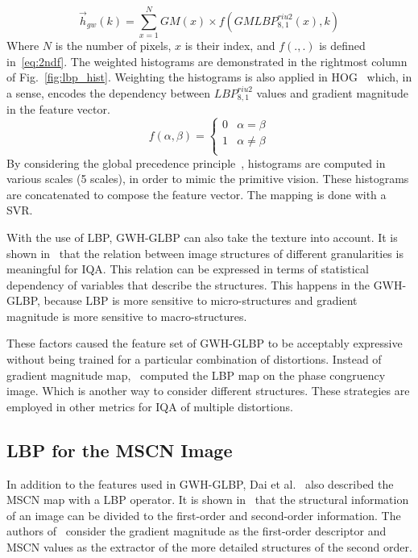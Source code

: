 \begin{equation}
    \Vec{h}_{gw}(k) = \sum_{x = 1}^NGM(x)\times f\left(GMLBP_{8, 1}^{riu2}(x), k\right)
    \label{eq:wh}
\end{equation}
Where $N$ is the number of pixels, $x$ is their index, and $f(., .)$ is defined in~\ref{eq:2ndf}. The weighted histograms are demonstrated in the rightmost column of Fig.~\ref{fig:lbp_hist}. Weighting the histograms is also applied in HOG~\cite{Dalal2005} which, in a sense, encodes the dependency between $LBP_{8, 1}^{riu2}$ values and gradient magnitude in the feature vector.
\begin{equation}
    f(\alpha, \beta) = 
    \begin{cases}
        0 & \alpha = \beta\\
        1 & \alpha \ne \beta\\
    \end{cases}
\label{eq:2ndf}
\end{equation}
By considering the global precedence principle~\cite{Hughes1996}, histograms are computed in various scales (5 scales), in order to mimic the primitive vision. These histograms are concatenated to compose the feature vector. The mapping is done with a SVR.

With the use of LBP, GWH-GLBP can also take the texture into account. It is shown in~\cite{Heydari2019, xue2014blind, Gu2017micromacro} that the relation between image structures of different granularities is meaningful for IQA. This relation can be expressed in terms of statistical dependency of variables that describe the structures. This happens in the GWH-GLBP, because LBP is more sensitive to micro-structures and gradient magnitude is more sensitive to macro-structures.

These factors caused the feature set of GWH-GLBP to be acceptably expressive without being trained for a particular combination of distortions. Instead of gradient magnitude map,~\cite{Miao2019} computed the LBP map on the phase congruency image. Which is another way to consider different structures. These strategies are employed in other metrics for IQA of multiple distortions.
\subsection{LBP for the MSCN Image}
In addition to the features used in GWH-GLBP, Dai et al.~\cite{Dai2018} also described the MSCN map with a LBP operator. It is shown in~\cite{Larsson2006} that the structural information of an image can be divided to the first-order and second-order information. The authors of~\cite{Dai2018} consider the gradient magnitude as the first-order descriptor and MSCN values as the extractor of the more detailed structures of the second order.

